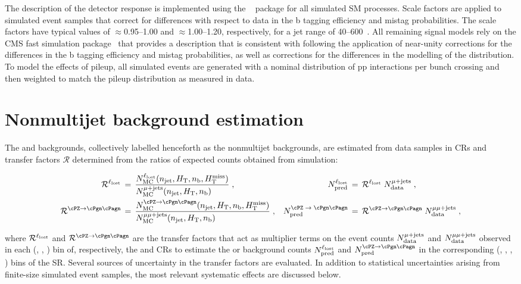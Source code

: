 The description of the detector response is implemented using the
\GEANTfour~\cite{geant} package for all simulated SM processes. Scale
factors are applied to simulated event samples that correct for
differences with respect to data in the b tagging efficiency and
mistag probabilities. The scale factors have typical values of
${\approx}$0.95--1.00 and ${\approx}$1.00--1.20, respectively, for a
jet \pt range of 40--600\GeV~\cite{BTV-16-002}. All remaining signal
models rely on the CMS fast simulation package~\cite{fastsim} that
provides a description that is consistent with \GEANTfour following
the application of near-unity corrections for the differences in the b
tagging efficiency and mistag probabilities, as well as corrections
for the differences in the modelling of the \mht distribution. To
model the effects of pileup, all simulated events are generated with a
nominal distribution of pp interactions per bunch crossing and then
weighted to match the pileup distribution as measured in data.

\section{Nonmultijet background estimation}
\label{sec:ewk}

The \lost and \znunuj backgrounds, collectively labelled henceforth as
the nonmultijet backgrounds, are estimated from data samples in CRs
and transfer factors $\mathcal{R}$ determined from the ratios of
expected counts obtained from simulation:

\begin{align}
  \tf^{\lost} \, & = \,
  \frac{N^{\lost}_\text{MC}(\njet, \scalht, \nb, \mht)}
  {N^{\mj}_\text{MC}(\njet, \scalht, \nb)\hfill} \; ,
  & 
  N^{\lost}_\text{pred} \, & = \,
  \tf^{\lost} \; N^{\mj}_\text{data} \; ,
  \\
  \tf^{\znunu} \, & = \,
  \frac{N^{\znunu}_\text{MC}(\njet, \scalht, \nb, \mht)}
  {N^{\mmj}_\text{MC}(\njet, \scalht, \nb)\hfill} \; ,
  & 
  N^\text{\znunu}_\text{pred} \, & = \,
  \tf^{\znunu} \; N^{\mmj}_\text{data} \; ,
\end{align}

where $\mathcal{R}^{\ell_\text{lost}}$ and $\tf^{\znunu}$ are the transfer factors that
act as multiplier terms on the event counts $N^{\mu\text{+\ensuremath{\text{jets}}}}_\text{data}$ and
$N^{\mu\mu\text{+\ensuremath{\text{jets}}}}_\text{data}$ observed in each (\njet, \scalht, \nb) bin of,
respectively, the \mj and \mmj CRs to estimate the \lost or \znunuj
background counts $N^{\ell_\text{lost}}_\text{pred}$ and $N^{\znunu}_\text{pred}$
in the corresponding (\njet, \scalht, \nb, \mht) bins of the
SR. Several sources of uncertainty in the transfer factors are
evaluated.  In addition to statistical uncertainties arising from
finite-size simulated event samples, the most relevant systematic
effects are discussed below.

